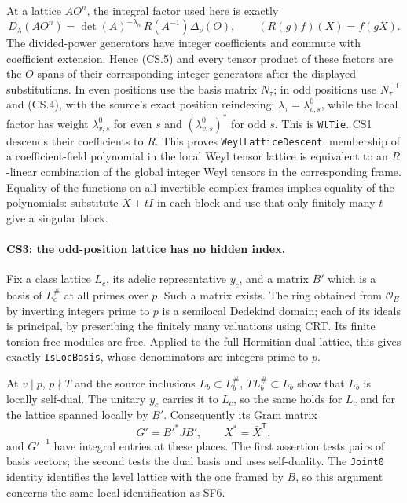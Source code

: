 At a lattice $A O^n$, the integral factor used here is exactly
\[
 D_\lambda(AO^n)=
 \det(A)^{-\lambda_n}\,R(A^{-1})\Delta_\nu(O),\qquad
 (R(g)f)(X)=f(gX).                                      \tag{CS.5}
\]
The divided-power generators have integer coefficients and commute
with coefficient extension. Hence (CS.5) and every tensor product of
these factors are the $O$-spans of their corresponding integer
generators after the displayed substitutions. In even positions use
the basis matrix $N_\tau$; in odd positions use $N_\tau^{-\mathsf T}$
and (CS.4), with the source's exact position reindexing: $\lambda_\tau=\lambda^0_{v,s}$,
while the local factor has weight $\lambda^0_{v,s}$ for even $s$ and
$(\lambda^0_{v,s})^*$ for odd $s$. This is \texttt{WtTie}. CS1 descends their coefficients to $R$.
This proves \texttt{WeylLatticeDescent}: membership of a coefficient-field
polynomial in the local Weyl tensor lattice is equivalent to an
$R$-linear combination of the global integer Weyl tensors in the
corresponding frame. Equality of the functions on all invertible complex
frames implies equality of the polynomials: substitute $X+tI$ in each
block and use that only finitely many $t$ give a singular block.

\paragraph{CS3: the odd-position lattice has no hidden index.}
Fix a class lattice $L_c$, its adelic representative $y_c$, and a
matrix $B'$ which is a basis of $L_c^\#$ at all primes over $p$.
Such a matrix exists. The ring obtained from $\mathcal O_E$ by
inverting integers prime to $p$ is a semilocal Dedekind domain;
each of its ideals is principal, by prescribing the finitely many
valuations using CRT. Its finite torsion-free modules are free.
Applied to the full Hermitian dual lattice, this gives exactly
\texttt{IsLocBasis}, whose denominators are integers prime to $p$.

At $v\mid p$, $p\nmid T$ and the source inclusions
$L_b\subset L_b^\#$, $T L_b^\#\subset L_b$ show that $L_b$ is
locally self-dual. The unitary $y_c$ carries it to $L_c$, so the same
holds for $L_c$ and for the lattice spanned locally by $B'$.
Consequently its Gram matrix
\[
 G'=B'^*JB',\qquad X^*=\bar X^{\mathsf T},
\]
and $G'^{-1}$ have integral entries at these places. The first assertion
tests pairs of basis vectors; the second tests the dual basis and uses
self-duality. The \texttt{Joint0} identity identifies the level lattice
with the one framed by $B$, so this argument concerns the same local
identification as SF6.

